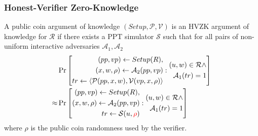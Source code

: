\documentclass[UFT8]{beamer}
\begin{document}
\begin{frame}
    \frametitle{Honest-Verifier Zero-Knowledge}

    \begin{definition}
        A {\color{red}public coin} argument of knowledge $(Setup, \mathcal{P}, \mathcal{V})$ is an HVZK argument of knowledge for $\mathcal{R}$ if there exists a PPT simulator $\mathcal{S}$ such that for all pairs of non-uniform interactive adversaries $\mathcal{A}_1, \mathcal{A}_2$
        \begin{align*}
            & \Pr\left[ \begin{aligned}
                (pp, vp) \leftarrow Setup(R), \\
                (x, w,\rho) \leftarrow \mathcal{A}_2(pp, vp) \\
                tr \leftarrow \langle \mathcal{P}(pp, x, w), \mathcal{V}(vp, x, \rho) \rangle
            \end{aligned}: \begin{aligned}
                (u, w) \in \mathcal{R} \land \\
                \mathcal{A}_1(tr) = 1
            \end{aligned} \right] \\
            \approx & \Pr\left[ \begin{aligned}
                (pp, vp) \leftarrow Setup(R), \\
                (x, w,\rho) \leftarrow \mathcal{A}_2(pp, vp) \\
                tr \leftarrow \mathcal{S}(u, {\color{red}\rho})
            \end{aligned}: \begin{aligned}
                (u, w) \in \mathcal{R} \land \\
                \mathcal{A}_1(tr) = 1 
            \end{aligned} \right]
        \end{align*}
        where $\rho$ is the public coin randomness used by the verifier.
    \end{definition}

\end{frame}
\end{document}
